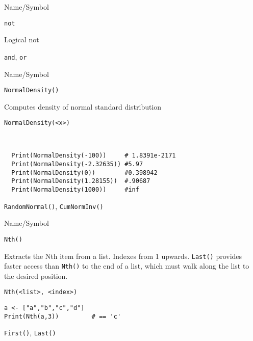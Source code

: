 \begin{desc}{Name/Symbol}
\item[Name/Symbol]	\verb+not+

\item[Description]	Logical not

\item[Usage]		

\item[Example]	

\item[See Also]	\verb+and+, \verb+or+
\end{desc}

\vfill
\newpage
{}
\vfill


\begin{desc}{Name/Symbol}
\item[Name/Symbol]	\verb+NormalDensity()+

\item[Description]	Computes density of normal standard distribution
\item[Usage]
\begin{verbatim}
NormalDensity(<x>)
\end{verbatim}

\item[Example]	
\begin{verbatim}


  Print(NormalDensity(-100))     # 1.8391e-2171
  Print(NormalDensity(-2.32635)) #5.97
  Print(NormalDensity(0))        #0.398942
  Print(NormalDensity(1.28155))  #.90687
  Print(NormalDensity(1000))     #inf

\end{verbatim}

\item[See Also]	\verb+RandomNormal()+, \verb+CumNormInv()+ 
\end{desc}



\begin{desc}{Name/Symbol}
\item[Name/Symbol]	\verb+Nth()+

\item[Description]	Extracts the Nth item from a list.  Indexes from 1 upwards.
		\verb+Last()+ provides faster access than \verb+Nth()+ to the end of a list, 
		which must walk along the list to the desired position.

\item[Usage]
\begin{verbatim}
Nth(<list>, <index>)
\end{verbatim}

\item[Example]	
\begin{verbatim}
a <- ["a","b","c","d"]
Print(Nth(a,3)) 		# == 'c'
\end{verbatim}

\item[See Also]	\verb+First()+, \verb+Last()+ 
\end{desc}

